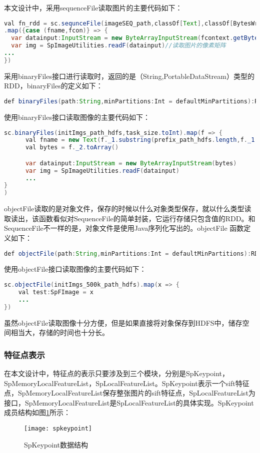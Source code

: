 本文设计中，采用sequenceFile读取图片的主要代码如下：
\begin{lstlisting}[language=Java,numbers=none,frame=none]
val fn_rdd = sc.sequnceFile(imageSEQ_path,classOf[Text],classOf[BytesWritable],task_size.toInt)
.map({case (fname,fcon)} => {
  var datainput:InputStream = new ByteArrayInputStream(fcontext.getBytes)
  var img = SpImageUtilities.readF(datainput)//读取图片的像素矩阵
...
})
\end{lstlisting}
采用binaryFiles接口进行读取时，返回的是（String,PortableDataStream）类型的RDD，binaryFiles的定义如下：
\begin{lstlisting}[language=Java,numbers=none,frame=none]
def binaryFiles(path:String,minPartitions:Int = defaultMinPartitions):RDD[(String,PortableDataStream)]=withScope{}
\end{lstlisting}
使用binaryFiles接口读取图像的主要代码如下：
\begin{lstlisting}[language=Java,numbers=none,frame=none]
 sc.binaryFiles(initImgs_path_hdfs,task_size.toInt).map(f => {
      val fname = new Text(f._1.substring(prefix_path_hdfs.length,f._1.length))//获取features key
      val bytes = f._2.toArray()

      var datainput:InputStream = new ByteArrayInputStream(bytes)
      var img = SpImageUtilities.readF(datainput)
      ...
}
)
\end{lstlisting}
objectFile读取的是对象文件，保存的时候以什么对象类型保存，就以什么类型读取读出，该函数看似对SequenceFile的简单封装，它运行存储只包含值的RDD。和SequenceFile不一样的是，对象文件是使用Java序列化写出的。objectFile 函数定义如下：
\begin{lstlisting}[language=Java,numbers=none,frame=none]
def objectFile(path:String,minPartitions:Int = defaultMinPartitions):RDD[T]=withScope{}
\end{lstlisting}
使用objectFile接口读取图像的主要代码如下：
\begin{lstlisting}[language=Java,numbers=none,frame=none]
sc.objectFile(initImgs_500k_path_hdfs).map(x => {
    val test:SpFImage = x
    ...
})
\end{lstlisting}
虽然objectFile读取图像十分方便，但是如果直接将对象保存到HDFS中，储存空间相当大，存储的时间也十分长。
\subsubsection{特征点表示}
在本文设计中，特征点的表示只要涉及到三个模块，分别是SpKeypoint，SpMemoryLocalFeatureList，SpLocalFeatureList。SpKeypoint表示一个sift特征点，SpMemoryLocalFeatureList保存整张图片的sift特征点，SpLocalFeatureList为接口，SpMemoryLocalFeatureList是SpLocalFeatureList的具体实现。SpKeypoint成员结构如图\ref{fig:spkeypoint}所示：
\begin{figure}[htp]
\centering
\texttt{[image: spkeypoint]}
\caption{SpKeypoint数据结构}
\label{fig:spkeypoint}
\end{figure}

